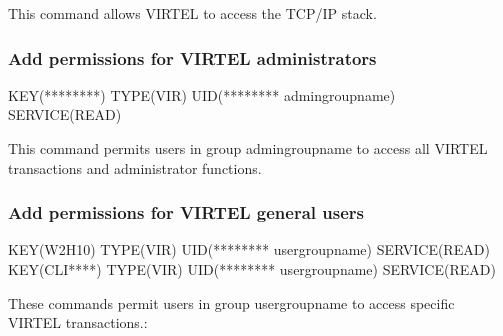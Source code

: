 \documentclass[letterpaper,10pt,english]{sphinxmanual}
\begin{document}
\sphinxAtStartPar
{}

\sphinxAtStartPar
This command allows VIRTEL to access the TCP/IP stack.


\subsubsection{Add permissions for VIRTEL administrators}
\label{\detokenize{Installation_Guide:add-permissions-for-virtel-administrators}}
\begin{sphinxVerbatim}[commandchars=\\\{\}]
\PYGZdl{}KEY(********) TYPE(VIR) UID(******** admin\PYGZhy{}group\PYGZhy{}name) SERVICE(READ)
\end{sphinxVerbatim}

\sphinxAtStartPar
{}

\sphinxAtStartPar
This command permits users in group admin\sphinxhyphen{}group\sphinxhyphen{}name to access all VIRTEL transactions and administrator functions.

\ignorespaces 

\subsubsection{Add permissions for VIRTEL general users}
\label{\detokenize{Installation_Guide:add-permissions-for-virtel-general-users}}\label{\detokenize{Installation_Guide:index-185}}
\begin{sphinxVerbatim}[commandchars=\\\{\}]
\PYGZdl{}KEY(W2H\PYGZhy{}10) TYPE(VIR) UID(******** user\PYGZhy{}group\PYGZhy{}name) SERVICE(READ)
\PYGZdl{}KEY(CLI\PYGZhy{}****) TYPE(VIR) UID(******** user\PYGZhy{}group\PYGZhy{}name) SERVICE(READ)
\end{sphinxVerbatim}

\sphinxAtStartPar
{}

\sphinxAtStartPar
These commands permit users in group user\sphinxhyphen{}group\sphinxhyphen{}name to access specific VIRTEL transactions.:
\end{document}
